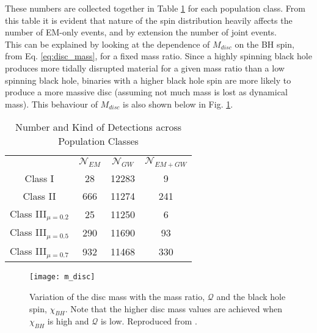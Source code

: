     These numbers are collected together in Table \ref{tab:popln_numbers} for each
    population class. From this table it is evident that nature of the spin distribution
    heavily affects the number of EM-only events, and by extension the number of joint
    events.\\
    This can be explained by looking at the dependence of $M_{disc}$ on the BH
    spin, from Eq. \ref{eq:disc_mass}, for a fixed mass ratio. Since a highly spinning
    black hole produces more tidally disrupted material for a given mass ratio than a
    low spinning black hole, binaries with a higher black hole spin are more likely to
    produce a more massive disc (assuming not much mass is lost as dynamical mass).
    This behaviour of $M_{disc}$ is also shown below in Fig. \ref{fig:m_disc}.

    \begin{table}[H]
        \centering
        \caption{Number and Kind of Detections across Population Classes}
        \begin{tabular}{cccc}
            \toprule

                &
            $\mathcal{N}_{EM}$ &
            $\mathcal{N}_{GW}$ &
            $\mathcal{N}_{EM+GW}$ \\

            Class I & 28 & 12283 & 9 \\

            Class II & 666 & 11274 & 241 \\

            Class III$_{\mu = 0.2}$ &
            25 & 11250 & 6 \\
            Class III$_{\mu = 0.5}$ &
            290 & 11690 & 93 \\
            Class III$_{\mu = 0.7}$ &
            932 & 11468 & 330 \\
            \bottomrule
        \end{tabular}
        \label{tab:popln_numbers}
    \end{table}


    \begin{figure}[H]
        \centering
        \texttt{[image: m\_disc]}
        \caption[Variation of $M_{\mathrm{disc}}$ with $\chi_{BH}$ and $\mathcal{Q}$]{
            Variation of the disc mass with the mass ratio, $\mathcal{Q}$ and the black
            hole spin, $\chi_{BH}$. Note that the higher disc mass values are achieved
            when $\chi_{BH}$ is high and $\mathcal{Q}$ is low. Reproduced from
            \cite{barbieri_2019b}.
        }
        \label{fig:m_disc}
    \end{figure}

